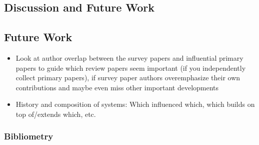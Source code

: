 \documentclass{article}
\begin{document}
\begin{multicols}{2}
    \section{Discussion and Future Work}
    \label{Discussion}
    \subsection{Future Work}
    \begin{itemize}
        \item Look at author overlap between the survey papers and influential primary papers to guide which review papers seem important (if you independently collect primary papers), if survey paper authors overemphasize their own contributions and maybe even miss other important developments
        \item History and composition of systems: Which influenced which, which builds on top of/extends which, etc.
    \end{itemize}

    \subsubsection{Bibliometry}

    \newpage
    \printbibliography
\end{multicols}
\end{document}
